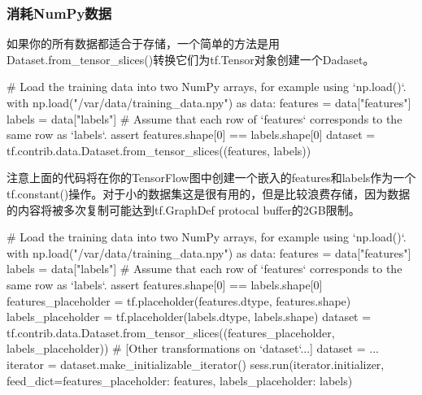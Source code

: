 \subsubsection{消耗NumPy数据}
如果你的所有数据都适合于存储，一个简单的方法是用Dataset.from\_tensor\_slices()转换它们为tf.Tensor对象创建一个Dadaset。
\begin{python}
# Load the training data into two NumPy arrays, for example using `np.load()`.
with np.load("/var/data/training_data.npy") as data:
    features = data["features"]
    labels = data["labels"]
# Assume that each row of `features` corresponds to the same row as `labels`.
assert features.shape[0] == labels.shape[0]
dataset = tf.contrib.data.Dataset.from_tensor_slices((features, labels))
\end{python}
注意上面的代码将在你的TensorFlow图中创建一个嵌入的features和labels作为一个tf.constant()操作。对于小的数据集这是很有用的，但是比较浪费存储，因为数据的内容将被多次复制可能达到tf.GraphDef protocal buffer的2GB限制。
\begin{python}
# Load the training data into two NumPy arrays, for example using `np.load()`.
with np.load("/var/data/training_data.npy") as data:
    features = data["features"]
    labels = data["labels"]
    # Assume that each row of `features` corresponds to the same row as `labels`.
assert features.shape[0] == labels.shape[0]
features_placeholder = tf.placeholder(features.dtype, features.shape)
labels_placeholder = tf.placeholder(labels.dtype, labels.shape)
dataset = tf.contrib.data.Dataset.from_tensor_slices((features_placeholder, labels_placeholder))
# [Other transformations on `dataset`...]
dataset = ...
iterator = dataset.make_initializable_iterator()
sess.run(iterator.initializer, feed_dict={features_placeholder: features,
                                        labels_placeholder: labels})
\end{python}
